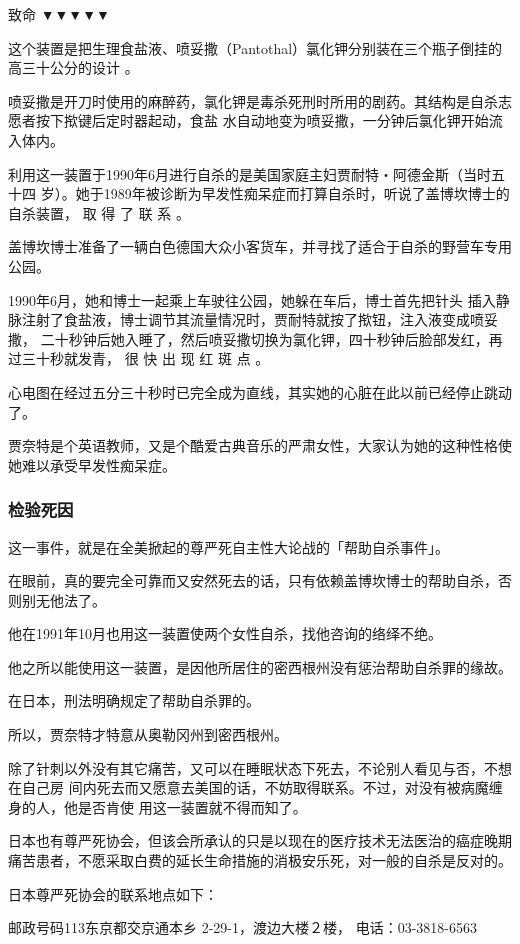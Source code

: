 \documentclass[UTF8]{ctexart}
\begin{document}
致命 ▼▼▼▼▼

这个装置是把生理食盐液、喷妥撒（Pantothal）氯化钾分别装在三个瓶子倒挂的高三十公分的设计 。

喷妥撒是开刀时使用的麻醉药，氯化钾是毒杀死刑时所用的剧药。其结构是自杀志愿者按下揿键后定时器起动，食盐 水自动地变为喷妥撒，一分钟后氯化钾开始流入体内。

利用这一装置于1990年6月进行自杀的是美国家庭主妇贾耐特‧阿德金斯（当时五十四 岁）。她于1989年被诊断为早发性痴呆症而打算自杀时，听说了盖博坎博士的自杀装置， 取 得 了 联 系 。

盖博坎博士准备了一辆白色德国大众小客货车，并寻找了适合于自杀的野营车专用公园。

1990年6月，她和博士一起乘上车驶往公园，她躲在车后，博士首先把针头 插入静脉注射了食盐液，博士调节其流量情况时，贾耐特就按了揿钮，注入液变成喷妥撒， 二十秒钟后她入睡了，然后喷妥撒切换为氯化钾，四十秒钟后脸部发红，再过三十秒就发青， 很 快 出 现 红 斑 点 。

心电图在经过五分三十秒时已完全成为直线，其实她的心脏在此以前已经停止跳动了。

贾奈特是个英语教师，又是个酷爱古典音乐的严肃女性，大家认为她的这种性格使她难以承受早发性痴呆症。

\subsubsection*{检验死因}

这一事件，就是在全美掀起的尊严死自主性大论战的「帮助自杀事件」。

在眼前，真的要完全可靠而又安然死去的话，只有依赖盖博坎博士的帮助自杀，否则别无他法了。

他在1991年10月也用这一装置使两个女性自杀，找他咨询的络绎不绝。

他之所以能使用这一装置，是因他所居住的密西根州没有惩治帮助自杀罪的缘故。

在日本，刑法明确规定了帮助自杀罪的。

所以，贾奈特才特意从奥勒冈州到密西根州。

除了针刺以外没有其它痛苦，又可以在睡眠状态下死去，不论别人看见与否，不想在自己房 间内死去而又愿意去美国的话，不妨取得联系。不过，对没有被病魔缠身的人，他是否肯使 用这一装置就不得而知了。

日本也有尊严死协会，但该会所承认的只是以现在的医疗技术无法医治的癌症晚期痛苦患者，不愿采取白费的延长生命措施的消极安乐死，对一般的自杀是反对的。

日本尊严死协会的联系地点如下：

邮政号码113东京都交京通本乡 2-29-1，渡边大楼２楼，
电话：03-3818-6563
\end{document}
